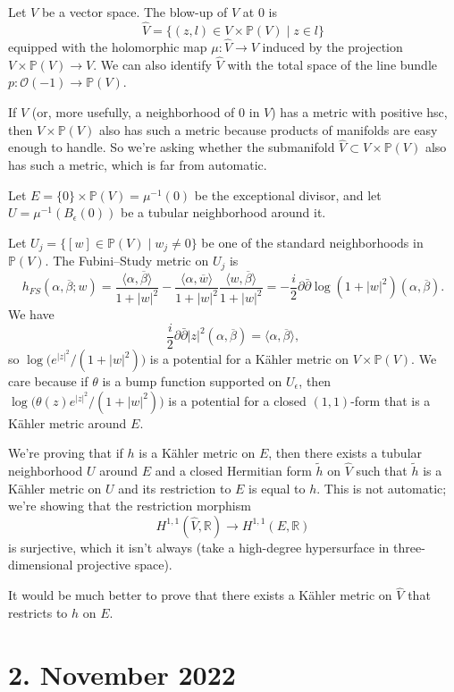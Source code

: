 \documentclass[11pt]{amsart}
\theoremstyle{definition}
\newcommand{\kk}[1]{\mathbb{#1}}
\newcommand{\cc}[1]{\mathcal{#1}}
\def\ov#1{\overline{#1}}
\begin{document}
Let $V$ be a vector space. The blow-up of $V$ at $0$ is
$$
\hat V = \{ (z, l) \in V \times \kk P(V) \mid z \in l \}
$$
equipped with the holomorphic map $\mu : \hat V \to V$ induced by the
projection $V \times \kk P(V) \to V$.
We can also identify $\hat V$ with the total space of the line bundle $p : \cc
O(-1) \to \kk P(V)$.

If $V$ (or, more usefully, a neighborhood of $0$ in $V$) has a metric with
positive hsc, then $V \times \kk P(V)$ also has such a metric because products
of manifolds are easy enough to handle.
So we're asking whether the submanifold $\hat V \subset V \times \kk P(V)$ also
has such a metric, which is far from automatic.

Let $E = \{0\} \times \kk P(V) = \mu^{-1}(0)$ be the exceptional divisor, and
let $U = \mu^{-1}(B_\epsilon(0))$ be a tubular neighborhood around it.

Let $U_j = \{ [w] \in \kk P(V) \mid w_j \not= 0 \}$ be one of the standard
neighborhoods in $\kk P(V)$. The Fubini--Study metric on $U_j$ is
$$
h_{FS}(\alpha, \ov\beta; w)
= \frac{\langle \alpha, \ov\beta \rangle}{1+|w|^2}
- \frac{\langle \alpha, \ov w \rangle}{1+|w|^2}
\frac{\langle w, \ov \beta \rangle}{1+|w|^2}
= -\frac i2 \partial \bar\partial \log(1+|w|^2)(\alpha, \ov\beta).
$$
We have
$$
\frac i2 \partial \bar\partial |z|^2(\alpha, \ov\beta)
= \langle \alpha, \ov\beta \rangle,
$$
so $\log \bigl( e^{|z|^2} / (1 + |w|^2) \bigr)$ is a potential for a K\"ahler
metric on $V \times \kk P(V)$.
We care because if $\theta$ is a bump function supported on $U_\epsilon$, then
$\log \bigl( \theta(z) e^{|z|^2} / (1 + |w|^2) \bigr)$
is a potential for a closed $(1,1)$-form that is a K\"ahler metric around $E$.

We're proving that if $h$ is a K\"ahler metric on $E$, then there exists a
tubular neighborhood $U$ around $E$ and a closed Hermitian form $\tilde h$ on
$\hat V$ such that $\tilde h$ is a K\"ahler metric on $U$ and its restriction
to $E$ is equal to $h$.
This is not automatic; we're showing that the restriction morphism
$$
H^{1,1}(\hat V,\kk R) \to H^{1,1}(E, \kk R)
$$
is surjective, which it isn't always (take a high-degree hypersurface in three-dimensional projective space).

It would be much better to prove that there exists a K\"ahler metric on $\hat
V$ that restricts to $h$ on $E$.



\section{2. November 2022}
\end{document}
